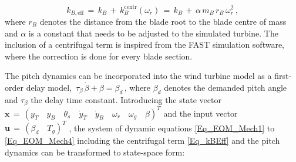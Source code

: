 \documentclass[a4paper]{article}
\newcommand{\yP}{\dot{y}}
\newcommand{\B}[1]{\mathbf{#1}}
\begin{document}
\begin{equation}
k_{B,\text{eff}} \, = \, k_B \, + \, k_B^\text{centr}\left(\omega_r\right) \, = \, k_B\, + \, \alpha \, m_B \, r_B \, \omega_r^2 \, ,
\label{Eq_kBEff}
\end{equation}
\newline where $r_B$ denotes the distance from the blade root to the blade centre of mass and $\alpha$ is a constant that needs to be adjusted to the simulated turbine. The inclusion of a centrifugal term is inspired from the FAST simulation software, where the correction is done for every blade section.

The pitch dynamics can be incorporated into the wind turbine model as a first-order delay model, $\, \tau_\beta\,\dot{\beta} + \beta = \beta_d\,$, where $\beta_d$ denotes the demanded pitch angle and $\tau_\beta$ the delay time constant.
\newline Introducing the state vector
$\B{x} \, = \, \left(y_T \quad y_B \quad \theta_s \quad \yP_T \quad \yP_B \quad \omega_r \quad \omega_g \quad \beta \right)^T$ and the input vector
$\B{u} \, = \, \left(\beta_d \quad T_g\right)^T$ , the system of dynamic
equations \eqref{Eq_EOM_Mech1} to \eqref{Eq_EOM_Mech4} including the centrifugal term \eqref{Eq_kBEff}
and the pitch dynamics can be transformed to state-space form:
\end{document}
